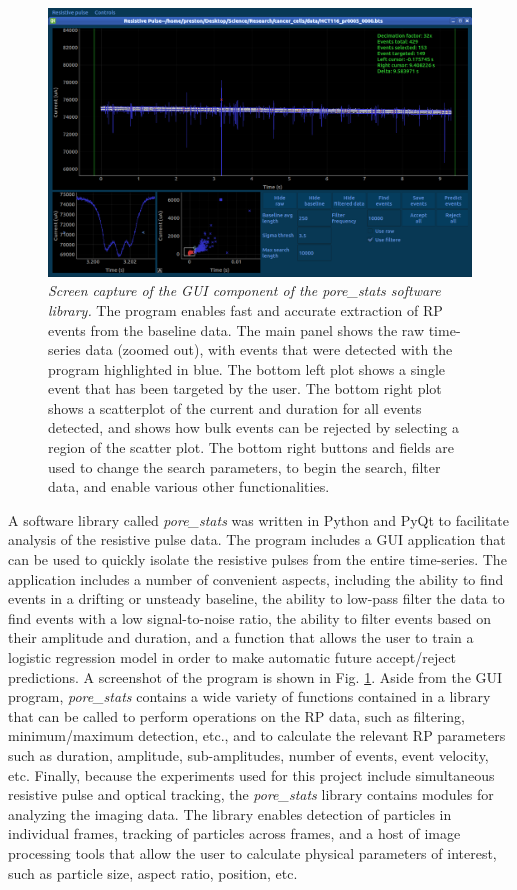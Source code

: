 		\begin{figure}
			\includegraphics[width=\textwidth]{porestats}
			\caption{\textit{Screen capture of the GUI component of the \textit{pore\_stats} software library.} The program enables fast and accurate extraction of RP events from the baseline data. The main panel shows the raw time-series data (zoomed out), with events that were detected with the program highlighted in blue. The bottom left plot shows a single event that has been targeted by the user. The bottom right plot shows a scatterplot of the current and duration for all events detected, and shows how bulk events can be rejected by selecting a region of the scatter plot. The bottom right buttons and fields are used to change the search parameters, to begin the search, filter data, and enable various other functionalities.}
			\label{fig:porestats}
		\end{figure}

		
		A software library called \textit{pore\_stats} was written in Python and PyQt to facilitate analysis of the resistive pulse data. The program includes a GUI application that can be used to quickly isolate the resistive pulses from the entire time-series. The application includes a number of convenient aspects, including the ability to find events in a drifting or unsteady baseline, the ability to low-pass filter the data to find events with a low signal-to-noise ratio, the ability to filter events based on their amplitude and duration, and a function that allows the user to train a logistic regression model in order to make automatic future accept/reject predictions. A screenshot of the program is shown in Fig. \ref{fig:porestats}. Aside from the GUI program, \textit{pore\_stats} contains a wide variety of functions contained in a library that can be called to perform operations on the RP data, such as filtering, minimum/maximum detection, etc., and to calculate the relevant RP parameters such as duration, amplitude, sub-amplitudes, number of events, event velocity, etc. Finally, because the experiments used for this project include simultaneous resistive pulse and optical tracking, the \textit{pore\_stats} library contains modules for analyzing the imaging data. The library enables detection of particles in individual frames, tracking of particles across frames, and a host of image processing tools that allow the user to calculate physical parameters of interest, such as particle size, aspect ratio, position, etc.
		
